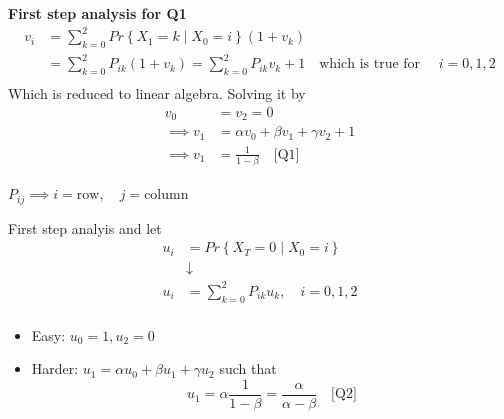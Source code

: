 \documentclass{article}
\theoremstyle{remark}
\begin{document}
   \textbf{First step analysis for Q1} 
   \[
     \begin{split}
   v_{i}  & = \sum_{k=0}^{2}  Pr \left \{ X_{1} = k  \mid  X_{0} = i \right \}  \left( 1 + v_{k} \right) \\
&= \sum_{k=0}^{2}  P_{ik} \left( 1+ v_{k} \right) = \sum_{k=0}^{2} P_{ik} v_{k} +1 \quad  \text{which is true for } \quad i = 0,1,2   \\
     \end{split} 
   \] 
   Which is reduced to linear algebra. Solving it by \[
   \begin{split}
     v_{0} &=  v_{2} = 0 \\
     \implies  v_{1} &= \alpha  v_{0} + \beta v_{1} + \gamma v_{2} + 1 \\
     \implies  v_{1} &=  \frac{1}{ 1- \beta } \quad  \text{[Q1]}  \\
   \end{split} 
   \] 
   \begin{tcolorbox}
     $P_{ij} \implies  i = \text{row} , \quad j = \text{column} $
   \end{tcolorbox}
   First step analyis and let \[
     \begin{split}
   u_{i}  & = Pr \left \{ X_{T} = 0  \mid  X_{0} = i \right \}  \\
     &  \downarrow \\
   u_{i} &= \sum_{k=0}^{2}  P_{ik} u_{k}, \quad i = 0,1,2   \\
     \end{split} 
   \] 
     \begin{itemize}
       \item Easy: $u_{0} = 1, u_{2} =0$
       \item Harder: $u_{1} = \alpha  u_{0} + \beta u_{1} + \gamma u_{2}$ such that \[
           u_{1} = \alpha \frac{1}{1- \beta }  = \frac{\alpha }{\alpha  - \beta }  \quad \text{[Q2]} 
       \] 
     \end{itemize}
   
\end{document}
